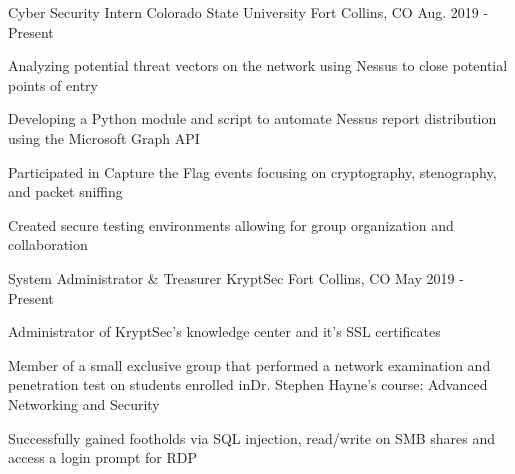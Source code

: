 \vspace{-3.0mm}

\begin{cventries}

  \cventry
    {Cyber Security Intern} %
    {Colorado State University} %
    {Fort Collins, CO} %
    {Aug. 2019 - Present} %
    {
      \begin{cvitems} %
        \item {Analyzing potential threat vectors on the network using Nessus to close potential points of entry}
        \item {Developing a Python module and script to automate Nessus report distribution using the Microsoft Graph API}
        \item {Participated in Capture the Flag events focusing on cryptography, stenography, and packet sniffing}
        \item {Created secure testing environments allowing for group organization and collaboration}
      \end{cvitems}
    }

  \cventry
    {System Administrator \& Treasurer} %
    {KryptSec} %
    {Fort Collins, CO} %
    {May 2019 - Present} %
    {
      \begin{cvitems} %
        \item {Administrator of KryptSec’s knowledge center and it’s SSL certificates}
        \item {Member of a small exclusive group that performed a network examination and penetration test on students enrolled inDr. Stephen Hayne’s course: Advanced Networking and Security}
        \item {Successfully gained footholds via SQL injection, read/write on SMB shares and access a login prompt for RDP}
      \end{cvitems}
    }


\end{cventries}
